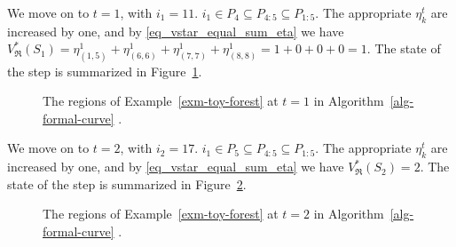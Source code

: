 \documentclass[
  11pt,
  a4paper,
]{article}
\theoremstyle{definition}
\theoremstyle{plain}
\theoremstyle{plain}
\theoremstyle{plain}
\theoremstyle{definition}
\theoremstyle{remark}
\begin{document}
We move on to \(t=1\), with \(i_1=11\).
\(i_1\in P_4\subseteq P_{4:5}\subseteq P_{1:5}\). The appropriate
\(\eta_k^t\) are increased by one, and by \eqref{eq_vstar_equal_sum_eta}
we have
\(V^*_{\mathfrak{R}}(S_1)=\eta_{(1, 5)}^1+\eta_{(6, 6)}^1+\eta_{(7, 7)}^1+\eta_{(8, 8)}^1=1+0+0+0=1\).
The state of the step is summarized in Figure~\ref{fig-t1}.

\begin{figure}


\caption{\label{fig-t1}The regions of Example~\ref{exm-toy-forest} at
\(t=1\) in  Algorithm~\ref{alg-formal-curve} .}

\end{figure}%

We move on to \(t=2\), with \(i_2=17\).
\(i_1\in P_5\subseteq P_{4:5}\subseteq P_{1:5}\). The appropriate
\(\eta_k^t\) are increased by one, and by \eqref{eq_vstar_equal_sum_eta}
we have \(V^*_{\mathfrak{R}}(S_2)=2\). The state of the step is
summarized in Figure~\ref{fig-t2}.

\begin{figure}


\caption{\label{fig-t2}The regions of Example~\ref{exm-toy-forest} at
\(t=2\) in  Algorithm~\ref{alg-formal-curve} .}

\end{figure}%
\end{document}
